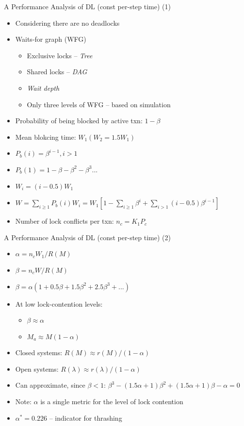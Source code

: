 \documentclass[sans]{beamer}
\begin{document}
\begin{frame}{A Performance Analysis of DL (const per-step time) (1)}
  \begin{itemize}
    \item Considering there are no deadlocks
    \item Waits-for graph (WFG)
    \begin{itemize}
      \item Exclusive locks -- \emph{Tree}
      \item Shared locks -- \emph{DAG}
      \item \emph{Wait depth}
      \item Only three levels of WFG -- based on simulation
    \end{itemize}
    \item Probability of being blocked by active txn: $1 - \beta$ 
    \item Mean blokcing time: $W_1 (W_2 = 1.5W_1)$
    \item $P_b(i) = \beta^{i - 1}, i > 1$
    \item $P_b(1) = 1 - \beta - \beta^2 - \beta^3 ...$
    \item $W_i = (i - 0.5)W_1$
    \item $W = \sum_{i \ge 1}P_b(i)W_i = W_1[1 - \sum_{i \ge 1} \beta^i +
      \sum_{i > 1}(i - 0.5)\beta^{i - 1}]$
    \item Number of lock conflicts per txn: $n_c = K_1P_c$
  \end{itemize}
\end{frame}

\begin{frame}{A Performance Analysis of DL (const per-step time) (2)}
  \begin{itemize}
    \item $\alpha = n_c W_1 / R(M)$
    \item $\beta = n_cW/R(M)$
    \item $\beta = \alpha(1 + 0.5\beta + 1.5\beta^2 + 2.5\beta^3 + ...)$
    \item At low lock-contention levels:
      \begin{itemize}
        \item $\beta \approx \alpha$
        \item $M_a \approx M (1- \alpha)$
      \end{itemize}
    \item Closed systems: $R(M)\approx r(M) / (1 - \alpha)$
    \item Open systems: $R(\lambda)\approx r(\lambda) / (1 - \alpha)$
    \item Can approximate, since $\beta < 1$:
      $\beta ^3 - (1.5 \alpha + 1)\beta^2 + (1.5 \alpha + 1)\beta - \alpha = 0$
    \item Note: $\alpha$ is a single metric for the level of lock contention
    \item $\alpha^* = 0.226$ -- indicator for thrashing
  \end{itemize}
\end{frame}
\end{document}
